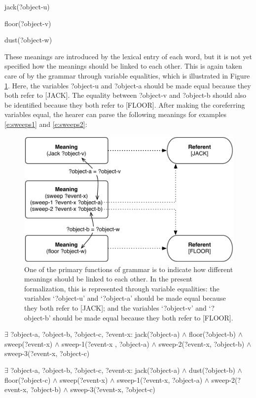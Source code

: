 \ea
jack(?object-u)
\item floor(?object-v)
\item dust(?object-w)
\z

These meanings are introduced by the lexical entry of each word, but it is not yet specified how the meanings should be linked to each other. This is again taken care of by the grammar through variable equalities, which is illustrated in Figure \ref{f:linking}. Here, the variables ?object-u and ?object-a should be made equal because they both refer to [JACK]. The equality between ?object-v and ?object-b should also be identified because they both refer to [FLOOR]. After making the coreferring variables equal, the hearer can parse the following meanings for examples \ref{e:sweeps1} and \ref{e:sweeps2}:

\begin{figure}[t]
\centerline{\includegraphics[width=0.8\linewidth]{Chapter2/figs/sweep-1}}
  \caption[Linking the meanings of an event]{One of the primary functions of grammar is to indicate how different meanings should be linked to each other. In the present formalization, this is represented through variable equalities: the variables `?object-u' and `?object-a' should be made equal because they both refer to [JACK]; and the variables `?object-v' and `?object-b' should be made equal because they both refer to [FLOOR].}
   \label{f:linking}
\end{figure}

\ea
$\exists$ ?object-a, ?object-b, ?object-c, ?event-x: jack(?object-a) $\wedge$ floor(?object-b) $\wedge$ sweep(?event-x) $\wedge$ sweep-1(?event-x , ?object-a) $\wedge$ sweep-2(?event-x, ?object-b) $\wedge$ sweep-3(?event-x, ?object-c)
\item $\exists$ ?object-a, ?object-b, ?object-c, ?event-x: jack(?object-a) $\wedge$ dust(?object-b) $\wedge$ floor(?object-c) $\wedge$ sweep(?event-x) $\wedge$ sweep-1(?event-x, ?object-a) $\wedge$ sweep-2(?event-x, ?object-b) $\wedge$ sweep-3(?event-x, ?object-c)
\z

